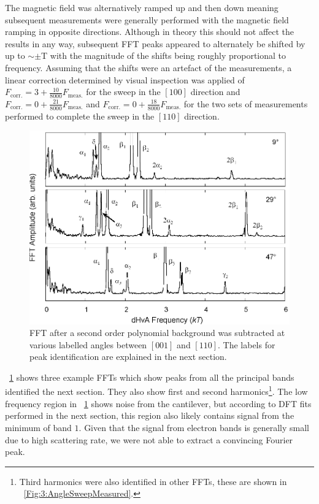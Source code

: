 The magnetic field was alternatively ramped up and then down meaning subsequent measurements were generally performed with the magnetic field ramping in opposite directions. Although in theory this should not affect the results in any way, subsequent FFT peaks appeared to alternately be shifted by up to $\sim\pm$\unit[21]{T} with the magnitude of the shifts being roughly proportional to frequency. Assuming that the shifts were an artefact of the measurements, a linear correction determined by visual inspection was applied of $F_{\textrm{corr.}} = 3 + \frac{10}{8000} F_{\textrm{meas.}}$ for the sweep in the $[100]$ direction and $F_{\textrm{corr.}} = 0 + \frac{21}{8000}  F_{\textrm{meas.}}$ and  $F_{\textrm{corr.}} = 0 + \frac{18}{8000} F_{\textrm{meas.}}$ for the two sets of measurements performed to complete the sweep in the $[110]$ direction.

\begin{figure}[htbp]
    \begin{center}
        \includegraphics[scale=0.7]{Chapter3-dHvABaFe2P2/Figures/AngleDepMeasurements/FFTExamples/FFTExamples}
        \caption{FFT after a second order polynomial background was subtracted at various labelled angles between $[001]$ and $[110]$. The labels for peak identification are explained in the next section.}
        \label{Fig:3:FFTExamples}
    \end{center}
\end{figure}
\Fig~\ref{Fig:3:FFTExamples} shows three example FFTs which show peaks from all the principal bands identified the next section. They also show first and second harmonics\footnote{Third harmonics were also identified in other FFTs, these are shown in \fig~\ref{Fig:3:AngleSweepMeasured}.}. The low frequency region in \fig~\ref{Fig:3:FFTExamples} shows noise from the cantilever, but according to DFT fits performed in the next section, this region also likely contains signal from the minimum of band $1$. Given that the signal from electron bands is generally small due to high scattering rate, we were not able to extract a convincing Fourier peak.

